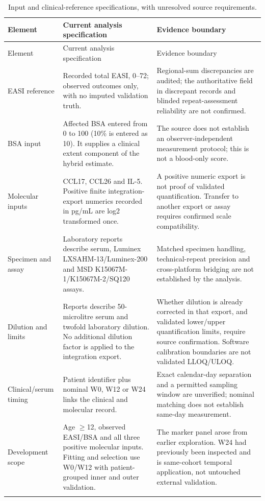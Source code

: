 \begin{longtable}{p{29mm}p{72mm}p{55mm}}
\caption{Input and clinical-reference specifications, with unresolved source requirements.}\label{tab:input_reference_specification}\\
\toprule Element & Current analysis specification & Evidence boundary \\ \midrule\endfirsthead
\toprule Element & Current analysis specification & Evidence boundary \\ \midrule\endhead
EASI reference & Recorded total EASI, 0--72; observed outcomes only, with no imputed validation truth. & Regional-sum discrepancies are audited; the authoritative field in discrepant records and blinded repeat-assessment reliability are not confirmed. \\ \addlinespace
BSA input & Affected BSA entered from 0 to 100 (10\% is entered as 10). It supplies a clinical extent component of the hybrid estimate. & The source does not establish an observer-independent measurement protocol; this is not a blood-only score. \\ \addlinespace
Molecular inputs & CCL17, CCL26 and IL-5. Positive finite integration-export numerics recorded in pg/mL are log2 transformed once. & A positive numeric export is not proof of validated quantification. Transfer to another export or assay requires confirmed scale compatibility. \\ \addlinespace
Specimen and assay & Laboratory reports describe serum, Luminex LXSAHM-13/Luminex-200 and MSD K15067M-1/K15067M-2/SQ120 assays. & Matched specimen handling, technical-repeat precision and cross-platform bridging are not established by the analysis. \\ \addlinespace
Dilution and limits & Reports describe 50-microlitre serum and twofold laboratory dilution. No additional dilution factor is applied to the integration export. & Whether dilution is already corrected in that export, and validated lower/upper quantification limits, require source confirmation. Software calibration boundaries are not validated LLOQ/ULOQ. \\ \addlinespace
Clinical/serum timing & Patient identifier plus nominal W0, W12 or W24 links the clinical and molecular record. & Exact calendar-day separation and a permitted sampling window are unverified; nominal matching does not establish same-day measurement. \\ \addlinespace
Development scope & Age $\geq$12, observed EASI/BSA and all three positive molecular inputs. Fitting and selection use W0/W12 with patient-grouped inner and outer validation. & The marker panel arose from earlier exploration. W24 had previously been inspected and is same-cohort temporal application, not untouched external validation. \\ \addlinespace

\end{longtable}
